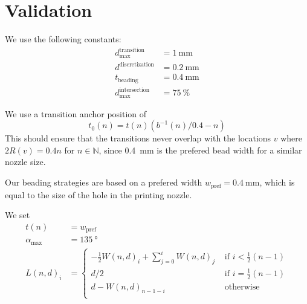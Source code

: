 \section{Validation}
We use the following constants:
\begin{align}
d_\text{max}^\text{transition} &= \SI{1}{\milli\meter} \\
d^\text{discretization} &= \SI{0.2}{\milli\meter} \\
t_\text{beading} &= \SI{0.4}{\milli\meter} \\
d_\text{max}^\text{intersection} &= \SI{75}{\percent}
\end{align}

We use a transition anchor position of
$$t_0(n) =  t(n) \left( b^{-1}(n) / 0.4  - n \right)$$
This should ensure that the transitions never overlap with the locations $v$ where $2 R(v) = 0.4n$ for $n \in \mathbb{N}$, since \SI{0.4}{\milli\meter} is the prefered bead width for a similar nozzle size.

Our beading strategies are based on a prefered width $w_\text{pref} = \SI{0.4}{\milli\meter}$, which is equal to the size of the hole in the printing nozzle.

We set 
\begin{align*}
t(n) &= w_\text{pref} \\
\alpha_\text{max} &= \SI{135}{\degree} \\
L(n,d)_i &= 
\begin{cases}
-\frac12 W(n,d)_i + \sum_{j=0}^i W(n,d)_j & \text{ if } i < \frac12 (n -1) \\
d/2 & \text{ if } i =  \frac12 (n -1) \\
d - W(n,d)_{n-1-i} & \text{ otherwise }\\
\end{cases}
\end{align*}


